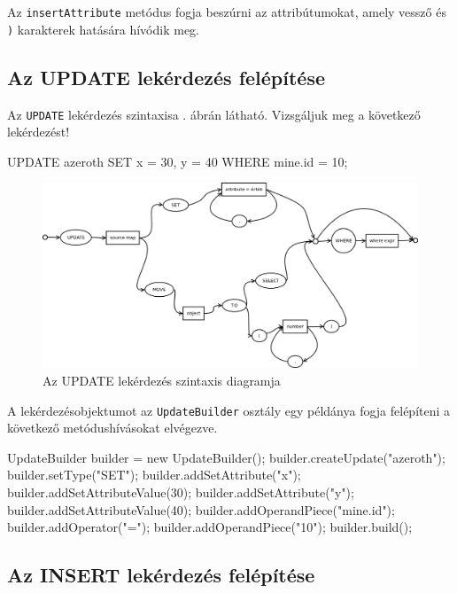 Az \texttt{insertAttribute} metódus fogja beszúrni az attribútumokat, amely vessző és \texttt{)} karakterek hatására hívódik meg.

\subsection{Az UPDATE lekérdezés felépítése}

Az \texttt{UPDATE} lekérdezés szintaxisa . ábrán látható. Vizsgáljuk meg a következő lekérdezést!
\begin{sql}
UPDATE azeroth SET x = 30, y = 40 WHERE mine.id = 10;
\end{sql}

\begin{figure}[htb]
	\begin{center}
		\includegraphics[scale=0.39]{images/update}
		\caption{Az UPDATE lekérdezés szintaxis diagramja}
		\label{fig:updateSytnax}
	\end{center}
\end{figure}

A lekérdezésobjektumot az \texttt{UpdateBuilder} osztály egy példánya fogja felépíteni a következő  metódushívásokat elvégezve.

\begin{java}
UpdateBuilder builder = new UpdateBuilder();
builder.createUpdate("azeroth");
builder.setType("SET");
builder.addSetAttribute("x");
builder.addSetAttributeValue(30);
builder.addSetAttribute("y");
builder.addSetAttributeValue(40);
builder.addOperandPiece("mine.id");
builder.addOperator("=");
builder.addOperandPiece("10");
builder.build();
\end{java}

\subsection{Az INSERT lekérdezés felépítése}


